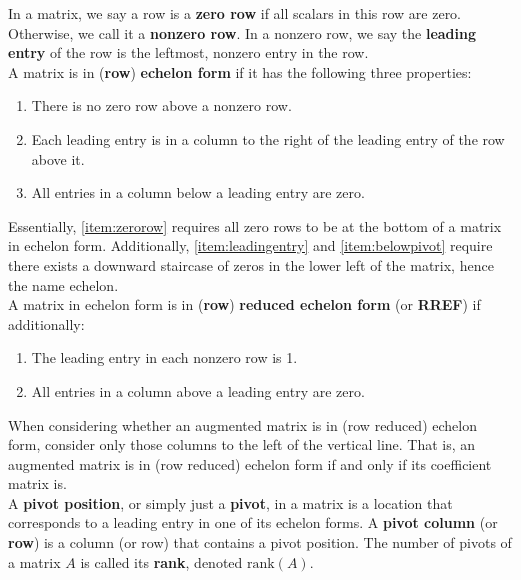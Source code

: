 \begin{Def}\label{def:echelon} In a matrix, we say a row is a \textbf{zero row} if all scalars in this row are zero. Otherwise, we call it a \textbf{nonzero row}. In a nonzero row, we say the \textbf{leading entry} of the row is the leftmost, nonzero entry in the row.\\

A matrix is in (\textbf{row}) \textbf{echelon form} if it has the following three properties: %
\begin{enumerate}[!LIST!, start=1]
\item\label{item:zerorow} There is no zero row above a nonzero row.
\item\label{item:leadingentry} Each leading entry is in a column to the right of the leading entry of the row above it.
\item\label{item:belowpivot} All entries in a column below a leading entry are zero.\\
\end{enumerate}

Essentially, \ref{item:zerorow} requires all zero rows to be at the bottom of a matrix in echelon form. Additionally, \ref{item:leadingentry} and \ref{item:belowpivot} require there exists a downward staircase of zeros in the lower left of the matrix, hence the name echelon.\\

A matrix in echelon form is in\label{def:RREF} (\textbf{row}) \textbf{reduced echelon form} (or \textbf{RREF}) if additionally:
\begin{enumerate}[!LIST!]
\item The leading entry in each nonzero row is 1.
\item All entries in a column above a leading entry are zero.\\
\end{enumerate}

When considering whether an augmented matrix is in (row reduced) echelon form, consider only those columns to the left of the vertical line. That is, an augmented matrix is in (row reduced) echelon form if and only if its coefficient matrix is.\\

A \label{def:pivot}\textbf{pivot position}, or simply just a \textbf{pivot}, in a matrix is a location that corresponds to a leading entry in one of its echelon forms. A \textbf{pivot column} (or \textbf{row}) is a column (or row) that contains a pivot position. The number of pivots of a matrix $A$ is called its \textbf{rank}, denoted $\text{rank}(A)$.
\end{Def}

